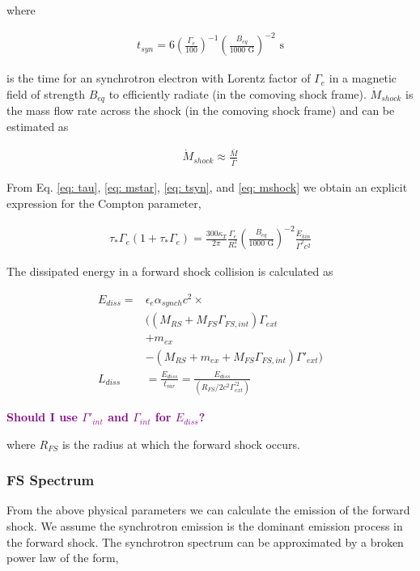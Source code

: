 \documentclass[linenumbers,twocolumn]{aastex631}
\newcommand{\mm}[1]{{\textcolor{purple}{\bf #1}}}
\begin{document}
where

\begin{align} \label{eq: tsyn}
	t_{syn} = 6\left(\frac{\Gamma_e}{100}\right)^{-1} \left(\frac{B_{eq}}{1000\text{ G}}\right)^{-2} \text{ s}
\end{align}

is the time for an synchrotron electron with Lorentz factor of $\Gamma_e$ in a magnetic field of strength $B_{eq}$ to efficiently radiate (in the comoving shock frame). $\dot{M}_{shock}$ is the mass flow rate across the shock (in the comoving shock frame) and can be estimated as 

\begin{align} \label{eq: mshock}
	\dot{M}_{shock} \approx \frac{\bar{M}}{\bar{\Gamma}}
\end{align}

From Eq. \ref{eq: tau}, \ref{eq: mstar}, \ref{eq: tsyn}, and \ref{eq: mshock} we obtain an explicit expression for the Compton parameter,

\begin{align}
	\tau_* \Gamma_e (1+\tau_* \Gamma_e) = \frac{300 \kappa_T}{2 \pi} \frac{\Gamma_e}{R_*^2} \left(\frac{B_{eq}}{1000\text{ G}}\right)^{-2} \frac{\dot{E}_{kin}}{\bar{\Gamma}^2 c^2}
\end{align}

The dissipated energy in a forward shock collision is calculated as

\begin{align}
	E_{diss} = & \epsilon_e \alpha_{synch}c^2\times \\ &( (M_{RS} + M_{FS}\Gamma_{FS,int})\Gamma_{ext}\\ &+ m_{ex}\\ &- (M_{RS} + m_{ex} + M_{FS}\Gamma_{FS,int})\Gamma'_{ext} )\\
	L_{diss} & = \frac{E_{diss}}{t_{var}} = \frac{E_{diss}}{(R_{FS}/2c^2\Gamma^{'2}_{ext})}
\end{align}

\mm{Should I use $\Gamma'_{int}$ and $\Gamma_{int}$ for $E_{diss}$? }

where $R_{FS}$ is the radius at which the forward shock occurs. 

\subsubsection{FS Spectrum}

From the above physical parameters we can calculate the emission of the forward shock. We assume the synchrotron emission is the dominant emission process in the forward shock. The synchrotron spectrum can be approximated by a broken power law of the form,
\end{document}
